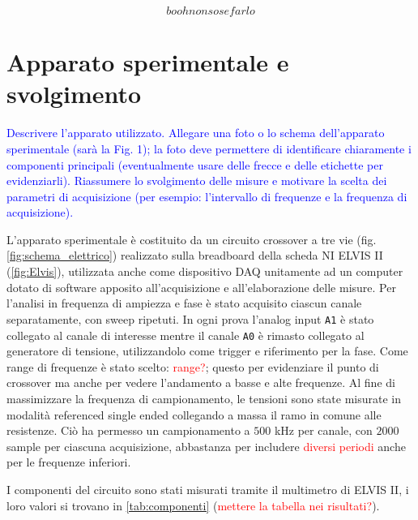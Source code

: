 \documentclass[12pt,italian]{article}
\newcommand{\prof}[1]{\textcolor{blue}{#1}}
\newcommand{\err}[1]{\textcolor{red}{#1}}
\begin{document}
\begin{equation}
  booh non so se farlo
\end{equation}

\section*{Apparato sperimentale e svolgimento}
\prof{ Descrivere l'apparato utilizzato. Allegare una foto o lo schema
  dell'apparato sperimentale (sarà la Fig. 1); la foto deve permettere di
  identificare chiaramente i componenti principali (eventualmente usare delle
  frecce e delle etichette per evidenziarli). Riassumere lo svolgimento delle
  misure e motivare la scelta dei parametri di acquisizione (per esempio:
  l'intervallo di frequenze e la frequenza di acquisizione). }

L'apparato sperimentale è costituito da un circuito crossover a tre vie (fig.
\ref{fig:schema_elettrico}) realizzato sulla breadboard della scheda NI ELVIS
II (\cref{fig:Elvis}), utilizzata anche come dispositivo DAQ unitamente ad un
computer dotato di software apposito all'acquisizione e all'elaborazione delle
misure. Per l'analisi in frequenza di ampiezza e fase è stato acquisito ciascun
canale separatamente, con sweep ripetuti. In ogni prova l'analog input
\texttt{A1} è stato collegato al canale di interesse mentre il canale
\texttt{A0} è rimasto collegato al generatore di tensione, utilizzandolo come
trigger e riferimento per la fase. Come range di frequenze è stato scelto:
\err{range?}; questo per evidenziare il punto di crossover ma anche per vedere
l'andamento a basse e alte frequenze. Al fine di massimizzare la frequenza di
campionamento, le tensioni sono state misurate in modalità referenced single
ended collegando a massa il ramo in comune alle resistenze. Ciò ha permesso un
campionamento a $500$ kHz per canale, con $2000$ sample per ciascuna
acquisizione, abbastanza per includere \err{diversi periodi} anche per le
frequenze inferiori.

I componenti del circuito sono stati misurati tramite il multimetro di ELVIS
II, i loro valori si trovano in \cref{tab:componenti} (\err{mettere la tabella
  nei risultati?}).
\end{document}
